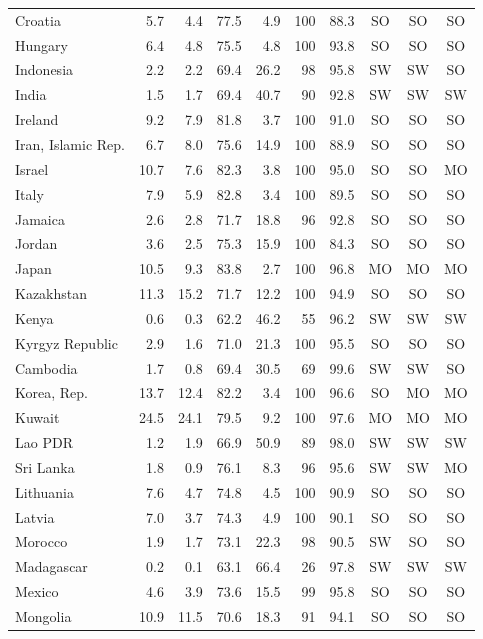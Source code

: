 \begin{longtable}{@{}lrrrrrrccc@{}}
Croatia & 5.7 & 4.4 & 77.5 & 4.9 & 100 & 88.3 & SO & SO & SO \\
Hungary & 6.4 & 4.8 & 75.5 & 4.8 & 100 & 93.8 & SO & SO & SO \\
Indonesia & 2.2 & 2.2 & 69.4 & 26.2 & 98 & 95.8 & SW & SW & SO \\
India & 1.5 & 1.7 & 69.4 & 40.7 & 90 & 92.8 & SW & SW & SW \\
Ireland & 9.2 & 7.9 & 81.8 & 3.7 & 100 & 91.0 & SO & SO & SO \\
Iran, Islamic Rep. & 6.7 & 8.0 & 75.6 & 14.9 & 100 & 88.9 & SO & SO & SO \\
Israel & 10.7 & 7.6 & 82.3 & 3.8 & 100 & 95.0 & SO & SO & MO \\
Italy & 7.9 & 5.9 & 82.8 & 3.4 & 100 & 89.5 & SO & SO & SO \\
Jamaica & 2.6 & 2.8 & 71.7 & 18.8 & 96 & 92.8 & SO & SO & SO \\
Jordan & 3.6 & 2.5 & 75.3 & 15.9 & 100 & 84.3 & SO & SO & SO \\
Japan & 10.5 & 9.3 & 83.8 & 2.7 & 100 & 96.8 & MO & MO & MO \\
Kazakhstan & 11.3 & 15.2 & 71.7 & 12.2 & 100 & 94.9 & SO & SO & SO \\
Kenya & 0.6 & 0.3 & 62.2 & 46.2 & 55 & 96.2 & SW & SW & SW \\
Kyrgyz Republic & 2.9 & 1.6 & 71.0 & 21.3 & 100 & 95.5 & SO & SO & SO \\
Cambodia & 1.7 & 0.8 & 69.4 & 30.5 & 69 & 99.6 & SW & SW & SO \\
Korea, Rep. & 13.7 & 12.4 & 82.2 & 3.4 & 100 & 96.6 & SO & MO & MO \\
Kuwait & 24.5 & 24.1 & 79.5 & 9.2 & 100 & 97.6 & MO & MO & MO \\
Lao PDR & 1.2 & 1.9 & 66.9 & 50.9 & 89 & 98.0 & SW & SW & SW \\
Sri Lanka & 1.8 & 0.9 & 76.1 & 8.3 & 96 & 95.6 & SW & SW & MO \\
Lithuania & 7.6 & 4.7 & 74.8 & 4.5 & 100 & 90.9 & SO & SO & SO \\
Latvia & 7.0 & 3.7 & 74.3 & 4.9 & 100 & 90.1 & SO & SO & SO \\
Morocco & 1.9 & 1.7 & 73.1 & 22.3 & 98 & 90.5 & SW & SO & SO \\
Madagascar & 0.2 & 0.1 & 63.1 & 66.4 & 26 & 97.8 & SW & SW & SW \\
Mexico & 4.6 & 3.9 & 73.6 & 15.5 & 99 & 95.8 & SO & SO & SO \\
Mongolia & 10.9 & 11.5 & 70.6 & 18.3 & 91 & 94.1 & SO & SO & SO \\

\end{longtable}
